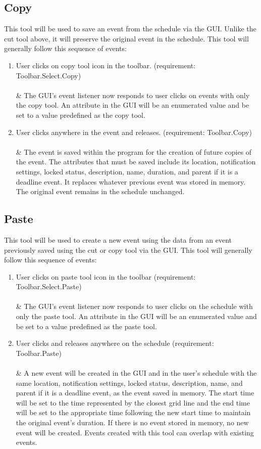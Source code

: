 \documentclass{scrreprt}
\begin{document}
\subsection{Copy}
This tool will be used to save an event from the schedule via the GUI. Unlike the cut tool above, it will preserve the original event in the schedule. This tool will generally follow this sequence of events:
\begin{enumerate}
    \item User clicks on copy tool icon in the toolbar. (requirement: Toolbar.Select.Copy)\\
    \\ & The GUI's event listener now responds to user clicks on events with only the copy tool. An attribute in the GUI will be an enumerated value and be set to a value predefined as the copy tool.
    \item User clicks anywhere in the event and releases. (requirement: Toolbar.Copy)\\
    \\ & The event is saved within the program for the creation of future copies of the event. The attributes that must be saved include its location, notification settings, locked status, description, name, duration, and parent if it is a deadline event. It replaces whatever previous event was stored in memory. The original event remains in the schedule unchanged.
\end{enumerate}

\subsection{Paste}
This tool will be used to create a new event using the data from an event previously saved using the cut or copy tool via the GUI. This tool will generally follow this sequence of events:
\begin{enumerate}
    \item User clicks on paste tool icon in the toolbar (requirement: Toolbar.Select.Paste)\\
    \\ & The GUI's event listener now responds to user clicks on the schedule with only the paste tool. An attribute in the GUI will be an enumerated value and be set to a value predefined as the paste tool.
    \item User clicks and releases anywhere on the schedule (requirement: Toolbar.Paste)\\
    \\ & A new event will be created in the GUI and in the user's schedule with the same location, notification settings, locked status, description, name, and parent if it is a deadline event, as the event saved in memory. The start time will be set to the time represented by the closest grid line and the end time will be set to the appropriate time following the new start time to maintain the original event's duration. If there is no event stored in memory, no new event will be created. Events created with this tool can overlap with existing events.
\end{enumerate}
\end{document}
